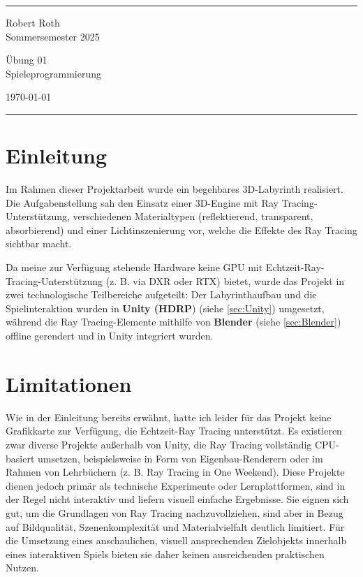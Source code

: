 \documentclass[a4paper]{article}
\begin{document}

\fancyhead[C]{}
\hrule \medskip %
\begin{minipage}{0.295\textwidth} 
\raggedright
\footnotesize
Robert Roth \hfill\\   
Sommersemester 2025\hfill\\  
\end{minipage}
\begin{minipage}{0.4\textwidth} 
\centering 
\large 
Übung 01\\ 
\normalsize 
Spieleprogrammierung\\ 
\end{minipage}
\begin{minipage}{0.295\textwidth} 
\raggedleft
\today\hfill\\
\end{minipage}
\medskip\hrule 
\bigskip



\section{Einleitung}
\label{sec:Einleitung}
Im Rahmen dieser Projektarbeit wurde ein begehbares 3D-Labyrinth realisiert. Die Aufgabenstellung sah den Einsatz einer 3D-Engine mit Ray Tracing-Unterstützung, verschiedenen Materialtypen (reflektierend, transparent, absorbierend) und einer Lichtinszenierung vor, welche die Effekte des Ray Tracing sichtbar macht.

Da meine zur Verfügung stehende Hardware keine GPU mit Echtzeit-Ray-Tracing-Unterstützung (z. B. via DXR oder RTX) bietet, wurde das Projekt in zwei technologische Teilbereiche aufgeteilt: Der Labyrinthaufbau und die Spielinteraktion wurden in \textbf{Unity (HDRP}) (siehe \autoref{sec:Unity}) umgesetzt, während die Ray Tracing-Elemente mithilfe von \textbf{Blender} (siehe \autoref{sec:Blender}) offline gerendert und in Unity integriert wurden.

\section{Limitationen}
\label{sec:Limitationen}
Wie in der Einleitung bereits erwähnt, hatte ich leider für das Projekt keine Grafikkarte zur Verfügung, die Echtzeit-Ray Tracing unterstützt. Es existieren zwar diverse Projekte außerhalb von Unity, die Ray Tracing vollständig CPU-basiert umsetzen, beispielsweise in Form von Eigenbau-Renderern oder im Rahmen von Lehrbüchern (z. B. Ray Tracing in One Weekend). Diese Projekte dienen jedoch primär als technische Experimente oder Lernplattformen, sind in der Regel nicht interaktiv und liefern visuell einfache Ergebnisse. Sie eignen sich gut, um die Grundlagen von Ray Tracing nachzuvollziehen, sind aber in Bezug auf Bildqualität, Szenenkomplexität und Materialvielfalt deutlich limitiert. Für die Umsetzung eines anschaulichen, visuell ansprechenden Zielobjekts innerhalb eines interaktiven Spiels bieten sie daher keinen ausreichenden praktischen Nutzen.
\end{document}
